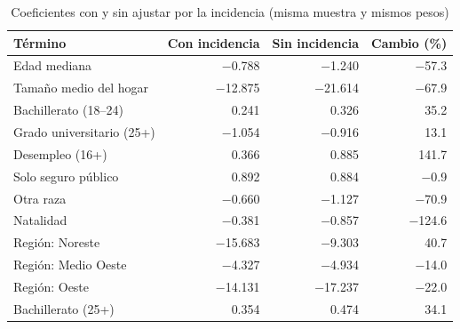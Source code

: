 \begin{table}[htbp]
\centering
\footnotesize
\caption{Coeficientes con y sin ajustar por la incidencia (misma muestra y mismos pesos)}\label{tab:incidencia}
\begin{tabularx}{\linewidth}{>{\raggedright\arraybackslash}X r r r}
\toprule
Término & Con incidencia & Sin incidencia & Cambio (\%) \\
\midrule
Edad mediana & \num{-0.788} & \num{-1.240} & \num{-57.3} \\
Tamaño medio del hogar & \num{-12.875} & \num{-21.614} & \num{-67.9} \\
Bachillerato (18–24) & \num{0.241} & \num{0.326} & \num{35.2} \\
Grado universitario (25+) & \num{-1.054} & \num{-0.916} & \num{13.1} \\
Desempleo (16+) & \num{0.366} & \num{0.885} & \num{141.7} \\
Solo seguro público & \num{0.892} & \num{0.884} & \num{-0.9} \\
Otra raza & \num{-0.660} & \num{-1.127} & \num{-70.9} \\
Natalidad & \num{-0.381} & \num{-0.857} & \num{-124.6} \\
Región: Noreste & \num{-15.683} & \num{-9.303} & \num{40.7} \\
Región: Medio Oeste & \num{-4.327} & \num{-4.934} & \num{-14.0} \\
Región: Oeste & \num{-14.131} & \num{-17.237} & \num{-22.0} \\
Bachillerato (25+) & \num{0.354} & \num{0.474} & \num{34.1} \\
\bottomrule
\end{tabularx}
\par{}
\end{table}
